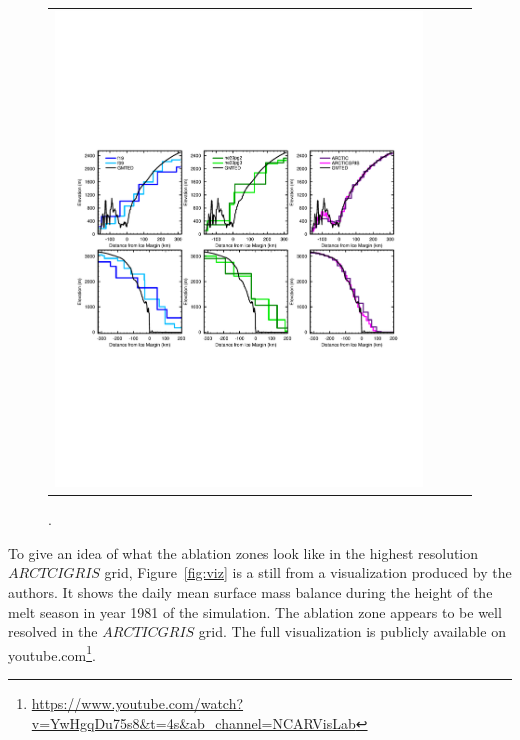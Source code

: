 \documentclass[draft]{agujournal2019}
\begin{document}
\begin{figure}[t]
\begin{center}
\begin{tabular}{cccc}
         \includegraphics[width=130mm]{figs/temp_zsects.pdf}
\end{tabular}
\end{center}
\caption{.}
\label{fig:ztrans}
\end{figure}

To give an idea of what the ablation zones look like in the highest resolution $ARCTCIGRIS$ grid, Figure~\ref{fig:viz} is a still from a visualization produced by the authors. It shows the daily mean surface mass balance during the height of the melt season in year 1981 of the simulation. The ablation zone appears to be well resolved in the $ARCTICGRIS$ grid. The full visualization is publicly available on youtube.com\footnote{\url{https://www.youtube.com/watch?v=YwHgqDu75s8&t=4s&ab_channel=NCARVisLab}}.

\end{document}
